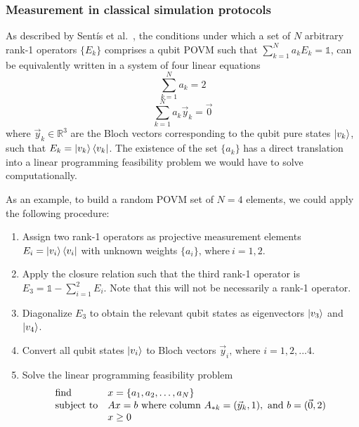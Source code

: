 \subsubsection{Measurement in classical simulation protocols}
As described by Sent\'is et al.\ \cite{sentis2013}, the conditions under which a set of $N$ arbitrary rank-1 operators $\{E_{k}\}$ comprises a qubit POVM such that $\sum_{k=1}^{N} a_{k} E_{k} = \mathbb{1}$, can be equivalently written in a system of four linear equations
\begin{equation}
    \sum_{k=1}^{N} a_{k} = 2
\end{equation}
\begin{equation}
    \sum_{k=1}^{N} a_{k} \vec{y}_{k} = \vec{0}
\end{equation}
where $\vec{y}_{k} \in \mathbb{R}^3$ are the Bloch vectors corresponding to the qubit pure states $\ket{v_{k}}$, such that $E_k = \ket{v_k}\bra{v_k}$. The existence of the set $\{a_{k}\}$ has a direct translation into a linear programming feasibility problem we would have to solve computationally.

As an example, to build a random POVM set of $N=4$ elements, we could apply the following procedure:
\begin{enumerate}
\item Assign two rank-1 operators as projective measurement elements $E_i = \ket{v_i}\bra{v_i}$ with unknown weights $\{a_i\} \text{, where}\ i=1,2$.
\item Apply the closure relation such that the third rank-1 operator is $E_3 = \mathbb{1} - \sum_{i=1}^{2}E_i$. Note that this will not be necessarily a rank-1 operator.
\item Diagonalize $E_3$ to obtain the relevant qubit states as eigenvectors $\ket{v_3}$ and $\ket{v_4}$.
\item Convert all qubit states $\ket{v_i}$ to Bloch vectors $\vec{y}_i \text{, where } i=1,2,...4$.
\item Solve the linear programming feasibility problem
\begin{equation*}
\begin{array}{ll@{}ll}
\text{find}  & x = \{a_1, a_2,\dots,a_N\} &\\
\text{subject to}& Ax = b\ \text{where column} \ A_{*k} = (\vec{y}_k, 1),\ \text{and}\ b = (\vec{0}, 2) \\
                 & x \geq 0 
\end{array}
\end{equation*}
\end{enumerate}

